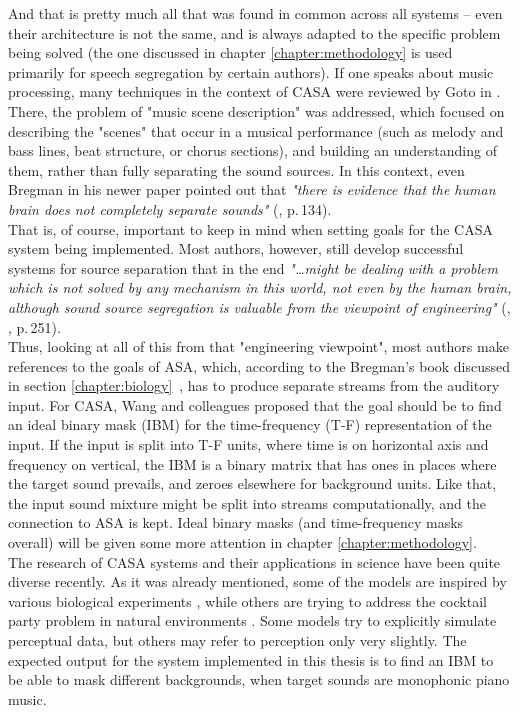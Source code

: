And that is pretty much all that was found in common across all systems -- even their architecture is not the same, and is always adapted to the specific problem being solved (the one discussed in chapter \ref{chapter:methodology} is used primarily for speech segregation by certain authors). If one speaks about music processing, many techniques in the context of CASA were reviewed by Goto in \cite{Wang2006}. There, the problem of "music scene description" was addressed, which focused on describing the "scenes" that occur in a musical performance (such as melody and bass lines, beat structure, or chorus sections), and building an understanding of them, rather than fully separating the sound sources. In this context, even Bregman in his newer paper pointed out that \textit{"there is evidence that the human brain does not completely separate sounds"} (\cite{Bregman1995}, p.\,134).\\

That is, of course, important to keep in mind when setting goals for the CASA system being implemented. Most authors, however, still develop successful systems for source separation that in the end \textit{"\dots{}might be dealing with a problem which is not solved by any mechanism in this world, not even by the human brain, although sound source segregation is valuable from the viewpoint of engineering"} (\cite{Goto2004}, \cite{Wang2006}, p.\,251).\\

Thus, looking at all of this from that "engineering viewpoint", most authors make references to the goals of ASA, which, according to the Bregman's book discussed in section \ref{chapter:biology}~\cite{Bregman1990}, has to produce separate streams from the auditory input. For CASA, Wang and colleagues \cite{Wang2005} proposed that the goal should be to find an ideal binary mask (IBM) for the time-frequency (T-F) representation of the input. If the input is split into T-F units, where time is on horizontal axis and frequency on vertical, the IBM is a binary matrix that has ones in places where the target sound prevails, and zeroes elsewhere for background units. Like that, the input sound mixture might be split into streams computationally, and the connection to ASA is kept. Ideal binary masks (and time-frequency masks overall) will be given some more attention in chapter \ref{chapter:methodology}.\\

The research of CASA systems and their applications in science \cite{Szabo2016} have been quite diverse recently. As it was already mentioned, some of the models are inspired by various biological experiments \cite{Wang2008}\cite{Boes2011}, while others are trying to address the cocktail party problem in natural environments \cite{Elhilali2008}. Some models try to explicitly simulate perceptual data, but others may refer to perception only very slightly. The expected output for the system implemented in this thesis is to find an IBM to be able to mask different backgrounds, when target sounds are monophonic piano music.\\

